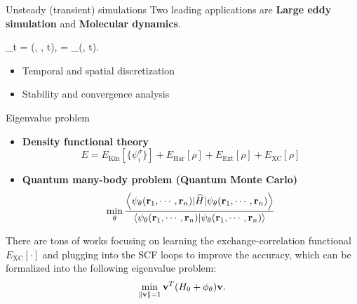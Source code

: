 \documentclass{beamer}
\begin{document}
\begin{frame}{Unsteady (transient) simulations}
	Two leading applications are \textbf{Large eddy simulation} and \textbf{Molecular dynamics}.
	\bequn\label{non-linear}
		\begin{aligned}
			\p_t \mfu = \mcL(\mfu, \mfy, t), 	\quad \mfy = \phi_{\theta}(\mfu, t).
		\end{aligned}
	\eequn
	\begin{itemize}
		\item Temporal and spatial discretization
		\item Stability and convergence analysis
	\end{itemize}
\end{frame}

\begin{frame}{Eigenvalue problem}
	\begin{itemize}
		\item \textbf{Density functional theory}
		\begin{equation*}
			E = E_{\mathrm{Kin}}[\{\psi_{i}^\sigma\}] + E_{\mathrm{Har}}[\rho] + E_{\mathrm{Ext}}[\rho] + E_{\mathrm{XC}}[\rho]
		\end{equation*}
		\item \textbf{Quantum many-body problem (Quantum Monte Carlo)}
		\begin{equation*}
			\min_{\theta} \frac{\left\langle \psi_{\theta}(\mathbf{r}_1, \cdots, \mathbf{r}_n)|\widehat H| \psi_{\theta}(\mathbf{r}_1, \cdots, \mathbf{r}_n)\right\rangle}{\left\langle \psi_{\theta}(\mathbf{r}_1, \cdots, \mathbf{r}_n)| \psi_{\theta}(\mathbf{r}_1, \cdots, \mathbf{r}_n)\right\rangle}
		\end{equation*}
	\end{itemize}
	There are tons of works focusing on learning the exchange-correlation functional $E_{\mathrm{XC}}[\cdot]$ and plugging into the SCF loops to improve the accuracy, which
	can be formalized into the following eigenvalue problem:
	\begin{equation*}
		\min_{\left\| \mathbf{v} \right\| = 1} \mathbf{v}^T (H_0 + \phi_{\theta}) \mathbf{v}.
	\end{equation*}
\end{frame}
\end{document}
